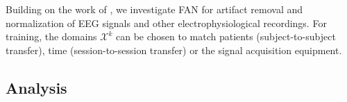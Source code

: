 \documentclass[10pt,a4paper]{article}
\newcommand{\X}{\mathcal{X}}
\begin{document}
Building on the work of \cite{Bug2017}, we investigate FAN for artifact removal and normalization of EEG signals and other electrophysiological recordings.
For training, the domains $\X^k$ can be chosen to match patients (subject-to-subject transfer), time (session-to-session transfer) or the signal acquisition equipment.

\footnotesize



\newpage
\begin{appendix}

    \section{Analysis}

\end{appendix}
\end{document}
